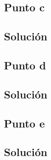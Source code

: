 \documentclass[12pt]{article}
\begin{document}
\subsection{Punto c}
\subsection{Solución}

\subsection{Punto d}
\subsection{Solución}

\subsection{Punto e}
\subsection{Solución}
\end{document}

